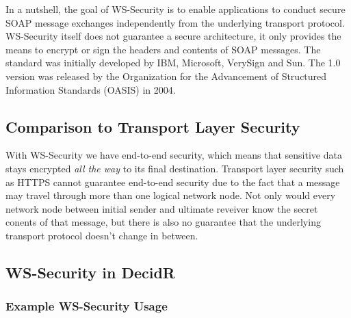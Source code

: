 In a nutshell, the goal of WS-Security is to enable applications to conduct
secure SOAP message exchanges\supercite{ws-sec} independently from the underlying transport
protocol. WS-Security itself does not guarantee a secure architecture, it only
provides the means to encrypt or sign the headers and contents of SOAP
messages. The standard was initially developed by IBM, Microsoft, VerySign and
Sun. The 1.0 version was released by the Organization for the Advancement
of Structured Information Standards (OASIS) in 2004. 

\subsection{Comparison to Transport Layer Security}
\label{sec:comparison-to-transport-layer-securtiy}

With WS-Security we have end-to-end security, which means that sensitive data
stays encrypted \emph{all the way} to its final destination. Transport layer
security such as HTTPS cannot guarantee end-to-end security due to
the fact that a message may travel through more than one logical network node.
Not only would every network node between initial sender and ultimate reveiver
know the secret conents of that message, but there is also no guarantee that the 
underlying transport protocol doesn't change in between.


\subsection{WS-Security in DecidR}
\label{subsec:ws-security-in-decidr}


\subsubsection{Example WS-Security Usage}
\label{subsec:example-ws-security-usage}
